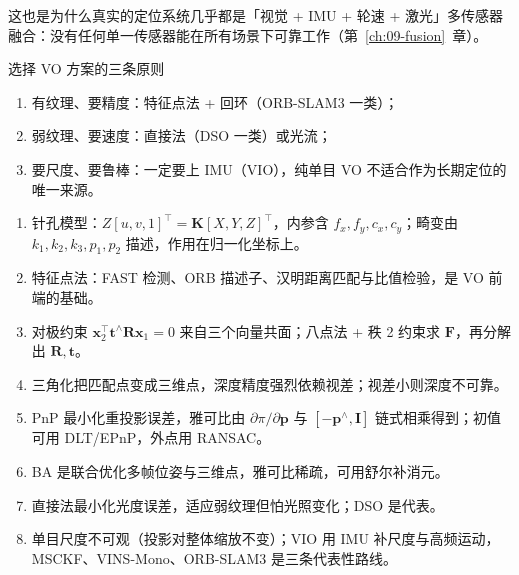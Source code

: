 这也是为什么真实的定位系统几乎都是「视觉 + IMU + 轮速 + 激光」多传感器融合：没有任何单一传感器能在所有场景下可靠工作（第~\ref{ch:09-fusion}~章）。

\begin{keybox}{选择 VO 方案的三条原则}
\begin{enumerate}
  \item 有纹理、要精度：特征点法 + 回环（ORB-SLAM3 一类）；
  \item 弱纹理、要速度：直接法（DSO 一类）或光流；
  \item 要尺度、要鲁棒：一定要上 IMU（VIO），纯单目 VO 不适合作为长期定位的唯一来源。
\end{enumerate}
\end{keybox}

\begin{summary}

\begin{enumerate}
  \item 针孔模型：$Z[u,v,1]^{\top}=\bm{K}[X,Y,Z]^{\top}$，内参含 $f_x,f_y,c_x,c_y$；畸变由 $k_1,k_2,k_3,p_1,p_2$ 描述，作用在归一化坐标上。
  \item 特征点法：FAST 检测、ORB 描述子、汉明距离匹配与比值检验，是 VO 前端的基础。
  \item 对极约束 $\bm{x}_2^{\top}\bm{t}^{\wedge}\bm{R}\bm{x}_1=0$ 来自三个向量共面；八点法 + 秩 2 约束求 $\bm{F}$，再分解出 $\bm{R},\bm{t}$。
  \item 三角化把匹配点变成三维点，深度精度强烈依赖视差；视差小则深度不可靠。
  \item PnP 最小化重投影误差，雅可比由 $\partial\pi/\partial\bm{p}$ 与 $[-\bm{p}^{\wedge},\bm{I}]$ 链式相乘得到；初值可用 DLT/EPnP，外点用 RANSAC。
  \item BA 是联合优化多帧位姿与三维点，雅可比稀疏，可用舒尔补消元。
  \item 直接法最小化光度误差，适应弱纹理但怕光照变化；DSO 是代表。
  \item 单目尺度不可观（投影对整体缩放不变）；VIO 用 IMU 补尺度与高频运动，MSCKF、VINS-Mono、ORB-SLAM3 是三条代表性路线。
\end{enumerate}


\end{summary}

